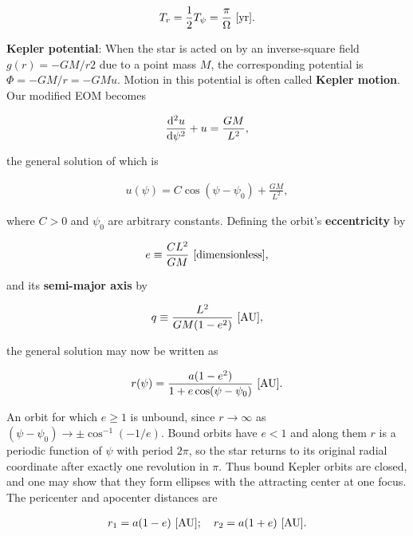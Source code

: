 \documentclass[a4paper,10pt]{article}
\begin{document}
\begin{align*}
    T_r = \frac{1}{2}T_\psi = \frac{\pi}{\Omega} ~ [{\rm yr}].
\end{align*}

{\noindent}\textbf{Kepler potential}: When the star is acted on by an inverse-square field $g(r)=−GM/r2$ due to a point mass $M$, the corresponding potential is $\Phi=−GM/r=−GMu$. Motion in this potential is often called \textbf{Kepler motion}. Our modified EOM becomes

\begin{align*}
    \frac{{\rm d}^2u}{{\rm d}\psi^2} + u = \frac{GM}{L^2},
\end{align*}

{\noindent}the general solution of which is

\begin{align*}
    u(\psi) = C\cos(\psi-\psi_0) + \frac{GM}{L^2},
\end{align*}

{\noindent}where $C>0$ and $\psi_0$ are arbitrary constants. Defining the orbit's \textbf{eccentricity} by

\begin{align*}
    e \equiv \frac{CL^2}{GM} ~ [{\rm dimensionless}],
\end{align*}

{\noindent}and its \textbf{semi-major axis} by

\begin{align*}
    q \equiv \frac{L^2}{GM(1-e^2)} ~ [{\rm AU}],
\end{align*}

{\noindent}the general solution may now be written as

\begin{align*}
    r(\psi) = \frac{a(1-e^2)}{1+e\cos(\psi-\psi_0)} ~ [{\rm AU}].
\end{align*}

{\noindent}An orbit for which $e\geq1$ is unbound, since $r\rightarrow\infty$ as $(\psi−\psi_0)\rightarrow\pm\cos^{-1}(−1/e)$. Bound orbits have $e<1$ and along them $r$ is a periodic function of $\psi$ with period $2\pi$, so the star returns to its original radial coordinate after exactly one revolution in $\pi$. Thus bound Kepler orbits are closed, and one may show that they form ellipses with the attracting center at one focus. The pericenter and apocenter distances are

\begin{align*}
    r_1 = a(1-e) ~ [{\rm AU}]; ~~~ r_2 = a(1+e) ~ [{\rm AU}].
\end{align*}
\end{document}
